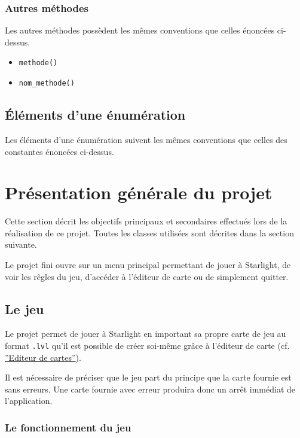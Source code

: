 \documentclass[]{article}
\begin{document}
\subsubsection{Autres méthodes}

Les autres méthodes possèdent les mêmes conventions que celles
énoncées ci-dessus.

\begin{itemize}
	\item \texttt{methode()}
	\item \texttt{nom\_methode()}
\end{itemize}

\subsection{Éléments d'une énumération} 

Les éléments d'une énumération suivent les mêmes conventions que celles des constantes énoncées ci-dessus.

\newpage
\section{Présentation générale du projet}

Cette section décrit les objectifs principaux et secondaires effectués lors
de la réalisation de ce projet.
Toutes les classes utilisées sont décrites dans la section suivante.

Le projet fini ouvre sur un menu principal permettant
de jouer à Starlight, de voir les rêgles du jeu, d'accéder à l'éditeur de 
carte ou de simplement quitter.

\subsection{Le jeu}

Le projet permet de jouer à Starlight en important sa propre carte de jeu
au format \texttt{.lvl} qu'il est possible de créer soi-même grâce à l'éditeur
de carte (cf. \hyperref[Editeur]{''Editeur de cartes''}).

Il est nécessaire de préciser que le jeu part du principe que la carte 
fournie est sans erreurs. Une carte fournie avec erreur produira donc
un arrêt immédiat de l'application.

\subsubsection{Le fonctionnement du jeu}
\end{document}
